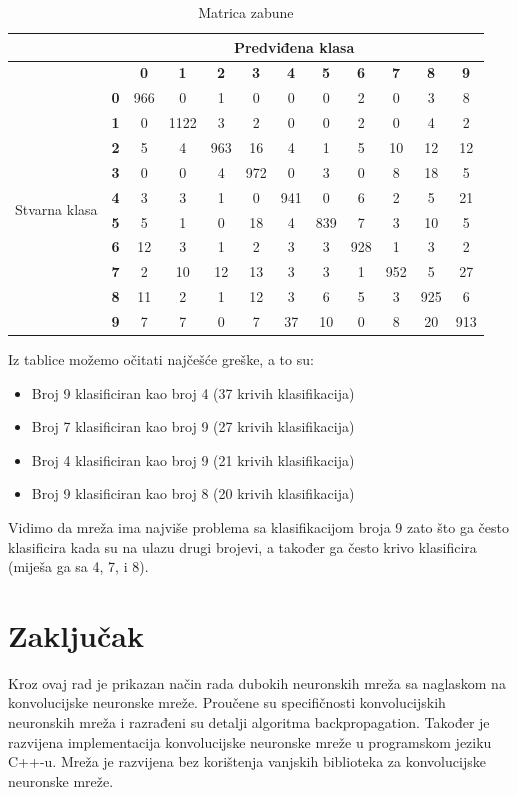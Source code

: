 \documentclass[times, utf8, zavrsni, numeric]{fer}
\begin{document}
\begin{table}
\caption{Matrica zabune}
\label{tbl:matrica-zabune}
\centering
\begin{tabular}{|c|c|c|c|c|c|c|c|c|c|c|c|} \hline
&\multicolumn{11}{|c|}{Predviđena klasa} \\ \hline
&&\textbf{0}&\textbf{1}&\textbf{2}&\textbf{3}&\textbf{4}&\textbf{5}&\textbf{6}&\textbf{7}&\textbf{8}&\textbf{9	}\\ \hline
\multirow{11}{*}{Stvarna klasa}
&\textbf{0}&966&0&1&0&0&0&2&0&3&8 \\
&\textbf{1}&0&1122&3&2&0&0&2&0&4&2 \\
&\textbf{2}&5&4&963&16&4&1&5&10&12&12 \\
&\textbf{3}&0&0&4&972&0&3&0&8&18&5 \\
&\textbf{4}&3&3&1&0&941&0&6&2&5&21 \\
&\textbf{5}&5&1&0&18&4&839&7&3&10&5 \\
&\textbf{6}&12&3&1&2&3&3&928&1&3&2 \\
&\textbf{7}&2&10&12&13&3&3&1&952&5&27 \\
&\textbf{8}&11&2&1&12&3&6&5&3&925&6 \\
&\textbf{9}&7&7&0&7&37&10&0&8&20&913 \\ \hline
\end{tabular}
\end{table}

Iz tablice možemo očitati najčešće greške, a to su:
\begin{itemize}
\item Broj 9 klasificiran kao broj 4 (37 krivih klasifikacija)
\item Broj 7 klasificiran kao broj 9 (27 krivih klasifikacija)
\item Broj 4 klasificiran kao broj 9 (21 krivih klasifikacija)
\item Broj 9 klasificiran kao broj 8 (20 krivih klasifikacija)
\end{itemize}

Vidimo da mreža ima najviše problema sa klasifikacijom broja 9 zato što ga često klasificira kada su na ulazu drugi brojevi, a također ga često krivo klasificira (miješa ga sa 4, 7, i 8).

\chapter{Zaključak}
Kroz ovaj rad je prikazan način rada dubokih neuronskih mreža sa naglaskom na konvolucijske neuronske mreže. Proučene su specifičnosti konvolucijskih neuronskih mreža i razrađeni su detalji algoritma backpropagation. Također je razvijena implementacija konvolucijske neuronske mreže u programskom jeziku C++-u. Mreža je razvijena bez korištenja vanjskih biblioteka za konvolucijske neuronske mreže. 
\end{document}
